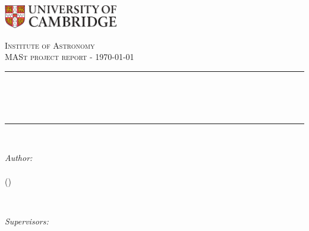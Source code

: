 \begin{titlepage}

\newcommand{\HRule}{\rule{\linewidth}{0.5mm}} %


\includegraphics[width = 5cm]{images/cam.pdf}\\[0.5cm] 

\center %


\textsc{\Large Institute of Astronomy}\\[0.5cm] 
\textsc{\large MASt  project report - \today}\\[0.5cm]


\doublespacing
\HRule \\[0.4cm]
{ \Huge \bfseries \reporttitle}\\
{ \Large \bfseries \reportsubtitle}\\ %
\HRule \\[1.5cm]
\linespread{1.2}

\begin{minipage}[t]{0.4\textwidth}
\begin{flushleft} \large
\emph{Author:}\\
\reportauthor\\
(\cid)

\end{flushleft}
\end{minipage}
~
\begin{minipage}[t]{0.4\textwidth}
\begin{flushright} \large
\emph{Supervisors:} \\
\supervisorone \\
\supervisortwo \\
\end{flushright}
\end{minipage}\\[2cm]


\end{titlepage}
